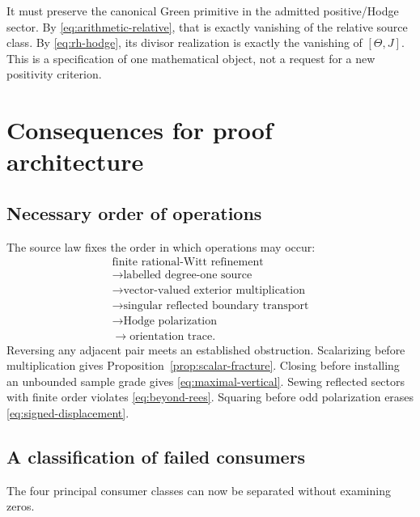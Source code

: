 \documentclass[11pt]{article}
\theoremstyle{definition}
\theoremstyle{remark}
\begin{document}
It must preserve the canonical Green primitive in the admitted
positive/Hodge sector.  By
\eqref{eq:arithmetic-relative}, that is exactly vanishing of the relative
source class.  By \eqref{eq:rh-hodge}, its divisor realization is exactly
the vanishing of \([\Theta,J]\).  This is a specification of one
mathematical object, not a request for a new positivity criterion.

\section{Consequences for proof architecture}

\subsection{Necessary order of operations}

The source law fixes the order in which operations may occur:
\[
\begin{gathered}
\text{finite rational-Witt refinement}\\
\longrightarrow
\text{labelled degree-one source}\\
\longrightarrow
\text{vector-valued exterior multiplication}\\
\longrightarrow
\text{singular reflected boundary transport}\\
\longrightarrow
\text{Hodge polarization}\\
\longrightarrow
\text{orientation trace}.
\end{gathered}
\tag{8.1}\label{eq:operation-order}
\]
Reversing any adjacent pair meets an established obstruction.
Scalarizing before multiplication gives
Proposition~\ref{prop:scalar-fracture}.  Closing before installing an
unbounded sample grade gives \eqref{eq:maximal-vertical}.  Sewing reflected
sectors with finite order violates \eqref{eq:beyond-rees}.  Squaring before
odd polarization erases \eqref{eq:signed-displacement}.

\subsection{A classification of failed consumers}

The four principal consumer classes can now be separated without examining
zeros.
\end{document}
